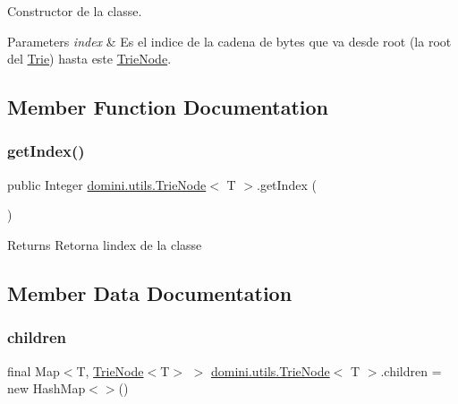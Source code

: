 Constructor de la classe. 


\begin{DoxyParams}{Parameters}
{\em index} & Es el indice de la cadena de bytes que va desde root (la root del \hyperlink{classdomini_1_1utils_1_1Trie}{Trie}) hasta este \hyperlink{classdomini_1_1utils_1_1TrieNode}{Trie\+Node}. \\
\hline
\end{DoxyParams}


\subsection{Member Function Documentation}
\mbox{\label{classdomini_1_1utils_1_1TrieNode_ac8e79df6ce5e7b33c6d08a0fe0681916}} 
\subsubsection{\texorpdfstring{get\+Index()}{getIndex()}}
{\footnotesize\ttfamily public Integer \hyperlink{classdomini_1_1utils_1_1TrieNode}{domini.\+utils.\+Trie\+Node}$<$ T $>$.get\+Index (\begin{DoxyParamCaption}{ }\end{DoxyParamCaption})\hspace{0.3cm}{\ttfamily [inline]}}

\begin{DoxyReturn}{Returns}
Retorna l\textquotesingle{}index de la classe 
\end{DoxyReturn}


\subsection{Member Data Documentation}
\mbox{\label{classdomini_1_1utils_1_1TrieNode_ae64d9c12696f526eecb3ff15aa290640}} 
\subsubsection{\texorpdfstring{children}{children}}
{\footnotesize\ttfamily final Map$<$T, \hyperlink{classdomini_1_1utils_1_1TrieNode}{Trie\+Node}$<$T$>$ $>$ \hyperlink{classdomini_1_1utils_1_1TrieNode}{domini.\+utils.\+Trie\+Node}$<$ T $>$.children = new Hash\+Map$<$$>$()\hspace{0.3cm}{\ttfamily [private]}}



